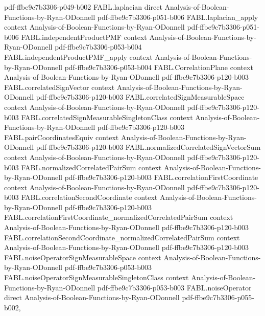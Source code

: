 \begin{theorem}
  {pdf-ffbe9c7b3306-p049-b002}
\proofstep
  {FABL.laplacian}
  {direct}
  {Analysis-of-Boolean-Functions-by-Ryan-ODonnell}
  {pdf-ffbe9c7b3306-p051-b006}
\proofstep
  {FABL.laplacian_apply}
  {context}
  {Analysis-of-Boolean-Functions-by-Ryan-ODonnell}
  {pdf-ffbe9c7b3306-p051-b006}
\proofstep
  {FABL.independentProductPMF}
  {context}
  {Analysis-of-Boolean-Functions-by-Ryan-ODonnell}
  {pdf-ffbe9c7b3306-p053-b004}
\proofstep
  {FABL.independentProductPMF_apply}
  {context}
  {Analysis-of-Boolean-Functions-by-Ryan-ODonnell}
  {pdf-ffbe9c7b3306-p053-b004}
\proofstep
  {FABL.CorrelationPlane}
  {context}
  {Analysis-of-Boolean-Functions-by-Ryan-ODonnell}
  {pdf-ffbe9c7b3306-p120-b003}
\proofstep
  {FABL.correlatedSignVector}
  {context}
  {Analysis-of-Boolean-Functions-by-Ryan-ODonnell}
  {pdf-ffbe9c7b3306-p120-b003}
\proofstep
  {FABL.correlatedSignMeasurableSpace}
  {context}
  {Analysis-of-Boolean-Functions-by-Ryan-ODonnell}
  {pdf-ffbe9c7b3306-p120-b003}
\proofstep
  {FABL.correlatedSignMeasurableSingletonClass}
  {context}
  {Analysis-of-Boolean-Functions-by-Ryan-ODonnell}
  {pdf-ffbe9c7b3306-p120-b003}
\proofstep
  {FABL.pairCoordinatesEquiv}
  {context}
  {Analysis-of-Boolean-Functions-by-Ryan-ODonnell}
  {pdf-ffbe9c7b3306-p120-b003}
\proofstep
  {FABL.normalizedCorrelatedSignVectorSum}
  {context}
  {Analysis-of-Boolean-Functions-by-Ryan-ODonnell}
  {pdf-ffbe9c7b3306-p120-b003}
\proofstep
  {FABL.normalizedCorrelatedPairSum}
  {context}
  {Analysis-of-Boolean-Functions-by-Ryan-ODonnell}
  {pdf-ffbe9c7b3306-p120-b003}
\proofstep
  {FABL.correlationFirstCoordinate}
  {context}
  {Analysis-of-Boolean-Functions-by-Ryan-ODonnell}
  {pdf-ffbe9c7b3306-p120-b003}
\proofstep
  {FABL.correlationSecondCoordinate}
  {context}
  {Analysis-of-Boolean-Functions-by-Ryan-ODonnell}
  {pdf-ffbe9c7b3306-p120-b003}
\proofstep
  {FABL.correlationFirstCoordinate_normalizedCorrelatedPairSum}
  {context}
  {Analysis-of-Boolean-Functions-by-Ryan-ODonnell}
  {pdf-ffbe9c7b3306-p120-b003}
\proofstep
  {FABL.correlationSecondCoordinate_normalizedCorrelatedPairSum}
  {context}
  {Analysis-of-Boolean-Functions-by-Ryan-ODonnell}
  {pdf-ffbe9c7b3306-p120-b003}
\proofstep
  {FABL.noiseOperatorSignMeasurableSpace}
  {context}
  {Analysis-of-Boolean-Functions-by-Ryan-ODonnell}
  {pdf-ffbe9c7b3306-p053-b003}
\proofstep
  {FABL.noiseOperatorSignMeasurableSingletonClass}
  {context}
  {Analysis-of-Boolean-Functions-by-Ryan-ODonnell}
  {pdf-ffbe9c7b3306-p053-b003}
\proofstep
  {FABL.noiseOperator}
  {direct}
  {Analysis-of-Boolean-Functions-by-Ryan-ODonnell}
  {pdf-ffbe9c7b3306-p055-b002,
}
\end{theorem}
